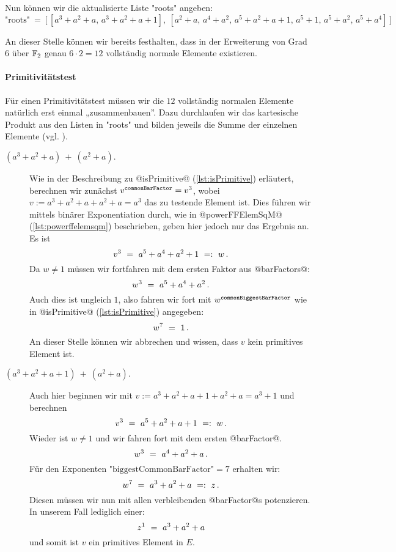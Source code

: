 Nun können wir die aktualisierte Liste "roots" angeben:
\[\text{"roots"}\ =\ \big[\, [a^3+a^2+a,\, a^3+a^2+a+1],\ 
  [a^2+a,\, a^4+a^2,\, a^5+a^2+a+1,\, a^5+1,\, a^5+a^2,\, a^5+a^4]\,\big]\]

An dieser Stelle können wir bereits festhalten, dass in der Erweiterung von
Grad $6$ über $\mathbb{F}_2$ genau $6\cdot 2=12$ vollständig normale Elemente
existieren.

\paragraph{Primitivitätstest}
Für einen Primitivitätstest müssen wir die $12$ vollständig normalen Elemente
natürlich erst einmal „zusammenbauen”. Dazu durchlaufen wir das kartesische
Produkt aus den Listen in "roots" und bilden jeweils die Summe der einzelnen
Elemente (vgl. \thref{def:vertraeglich}).
\begin{description}
  \item[$(a^3+a^2+a)\ +\ (a^2+a).$] 
    Wie in der Beschreibung zu @isPrimitive@ (\autoref{lst:isPrimitive})
    erläutert, berechnen wir zunächst $v^\texttt{\scriptsize commonBarFactor} = v^3$,
    wobei $v := a^3+a^2+a + a^2+a = a^3$ das zu testende Element ist.
    Dies führen wir mittels binärer Exponentiation durch, wie in 
    @powerFFElemSqM@ (\autoref{lst:powerffelemsqm}) beschrieben, geben hier
    jedoch nur das Ergebnis an. Es ist 
    \[ v^3 \ =\   a^5 + a^4 + a^2 + 1 \ =:\  w\,.\]
    Da $w \neq 1$ müssen wir fortfahren mit dem ersten Faktor aus 
    @barFactors@:
    \[ w^3 \ =\  a^5 + a^4 + a^2\,. \]
    Auch dies ist ungleich $1$, also fahren wir fort mit 
    $w^\texttt{\scriptsize commonBiggestBarFactor}$ wie in 
    @isPrimitive@ (\autoref{lst:isPrimitive}) angegeben:
    \[ w^7 \ =\  1\,.\]
    An dieser Stelle können wir abbrechen und wissen, dass $v$ kein
    primitives Element ist.
  \item[$(a^3+a^2+a+1)\ +\ (a^2+a).$]
    Auch hier beginnen wir mit $v := a^3+a^2+a+1 + a^2+a = a^3+1$ und 
    berechnen
    \[ v^3 \ =\  a^5+a^2+a+1 \ =:\  w \,.\]
    Wieder ist $w\neq 1$ und wir fahren fort mit dem ersten @barFactor@.
    \[ w^3 \ =\  a^4+a^2+a\,.\]
    Für den Exponenten $\text{"biggestCommonBarFactor"} = 7$ erhalten wir:
    \[ w^7 \ =\  a^3+a^2+a \ =:\  z\,.\]
    Diesen müssen wir nun mit allen verbleibenden @barFactor@s potenzieren. In
    unserem Fall lediglich einer:
    \[ z^1 \ =\  a^3+a^2+a \]
    und somit ist $v$ ein primitives Element in $E$.
\end{description}

